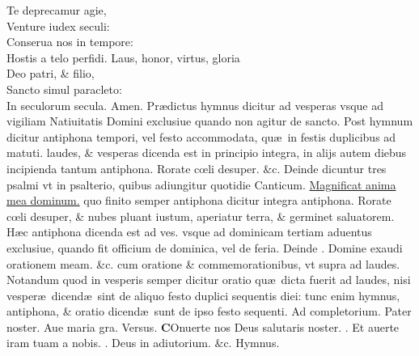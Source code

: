 \documentclass[a5paper,10pt]{book}
\makeatletter
\DeclareRobustCommand{\Vbar}{\vers@resp{-0.1em}{V}}
\DeclareRobustCommand{\Rbar}{\vers@resp{0pt}{R}}
\newcommand{\vers@resp@sym}{\raisebox{0.2ex}{\rotatebox[origin=c]{-20}{$\m@th\rceil$}}}
\newcommand{\vers@resp}[2]{%
  {\ooalign{\hidewidth\kern#1\vers@resp@sym\hidewidth\cr#2\cr}}%
}%
\def\ae{æ}
\def\oe{œ}
\makeatother
\begin{document}
\begin{multicols*}{2}
\newline \color{red} T\color{black}e deprecamur agie,\\Venture iudex seculi:\\Conserua nos in tempore:\\Hostis a telo perfidi.
\newline \color{red} L\color{black}aus, honor, virtus, gloria\\Deo patri, \& filio,\\Sancto simul paracleto:\\In seculorum secula. Amen.
\newline {} \color{red} Pr\ae dictus hymnus dicitur ad vesperas vsque ad vigiliam Natiuitatis Domini exclusiue quando non agitur de sancto. \color{black}
\newline {} \color{red} Post hymnum dicitur antiphona tempori, vel festo accommodata, qu\ae \ in festis duplicibus ad matuti. laudes, \& vesperas dicenda est in principio integra, in alijs autem diebus incipienda tantum antiphona. \color{black} Rorate c\oe li desuper. \&c. \color{red} Deinde dicuntur tres psalmi vt in psalterio, quibus adiungitur quotidie Canticum. \color{black} \hyperlink{Magnificat}{Magnificat anima mea dominum.} \color{red} quo finito semper antiphona dicitur integra antiphona. \color{black} Rorate c\oe li desuper, \& nubes pluant iustum, aperiatur terra, \& germinet saluatorem.
\newline {} \color{red} H\ae c antiphona dicenda est ad ves. vsque ad dominicam tertiam aduentus exclusiue, quando fit officium de dominica, vel de feria. Deinde \Vbar . \color{black} Domine exaudi orationem meam. \&c. \color{red} cum oratione \& commemorationibus, vt supra ad laudes. \color{black}
\newline \color{red} Notandum quod in vesperis semper dicitur oratio qu\ae \ dicta fuerit
ad laudes, nisi vesper\ae \ dicend\ae \ sint de aliquo festo duplici sequentis diei: tunc enim hymnus, antiphona, \& oratio dicend\ae \ sunt de ipso festo sequenti. \color{black}
\newline {} \color{red} Ad \hypertarget{DOM-PRIMA-ADV-COM}{completorium.} \color{black}
Pater noster. Aue maria gra. \quad \color{red} Versus. \color{black}
\vspace{-.25em}
\lettrine[lines=2]{\bfseries C}{}Onuerte nos Deus salutaris noster. \color{red} \Rbar . \color{black} Et auerte iram tuam a nobis. \color{red} \Vbar . \color{black} Deus in adiutorium. \color{red} \&c. Hymnus. \color{black}

\end{multicols*}
\end{document}
